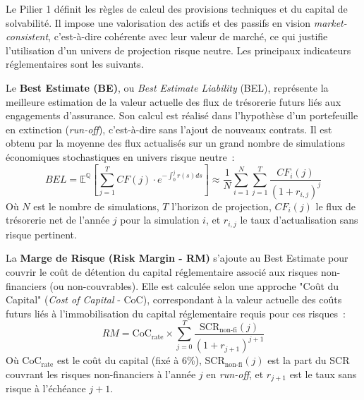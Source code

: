 Le Pilier 1 définit les règles de calcul des provisions techniques et du capital de solvabilité. Il impose une valorisation des actifs et des passifs en vision \textit{market-consistent}, c'est-à-dire cohérente avec leur valeur de marché, ce qui justifie l'utilisation d'un univers de projection risque neutre. Les principaux indicateurs réglementaires sont les suivants.

\bigskip

Le \textbf{Best Estimate (BE)}, ou \textit{Best Estimate Liability} (BEL), représente la meilleure estimation de la valeur actuelle des flux de trésorerie futurs liés aux engagements d'assurance. Son calcul est réalisé dans l'hypothèse d'un portefeuille en extinction (\textit{run-off}), c'est-à-dire sans l'ajout de nouveaux contrats. Il est obtenu par la moyenne des flux actualisés sur un grand nombre de simulations économiques stochastiques en univers risque neutre~:
\begin{equation}
    BEL = \mathbb{E}^{\mathbb{Q}} \left[ \sum_{j=1}^{T} CF(j) \cdot e^{-\int_0^j r(s)ds} \right] \approx \frac{1}{N}\sum_{i=1}^{N}\sum_{j=1}^{T}\frac{CF_{i}(j)}{(1+r_{i,j})^{j}}
\end{equation}
Où $N$ est le nombre de simulations, $T$ l'horizon de projection, $CF_{i}(j)$ le flux de trésorerie net de l'année $j$ pour la simulation $i$, et $r_{i,j}$ le taux d'actualisation sans risque pertinent.

\bigskip

La \textbf{Marge de Risque (Risk Margin - RM)} s'ajoute au Best Estimate pour couvrir le coût de détention du capital réglementaire associé aux risques non-financiers (ou non-couvrables). Elle est calculée selon une approche "Coût du Capital" (\textit{Cost of Capital} - CoC), correspondant à la valeur actuelle des coûts futurs liés à l'immobilisation du capital réglementaire requis pour ces risques~:
\begin{equation}
    RM = \text{CoC}_{\text{rate}} \times \sum_{j=0}^{T} \frac{\text{SCR}_{\text{non-fi}}(j)}{(1+r_{j+1})^{j+1}}
\end{equation}
Où $\text{CoC}_{\text{rate}}$ est le coût du capital (fixé à 6\%), $\text{SCR}_{\text{non-fi}}(j)$ est la part du SCR couvrant les risques non-financiers à l'année $j$ en \textit{run-off}, et $r_{j+1}$ est le taux sans risque à l'échéance $j+1$.

\bigskip


